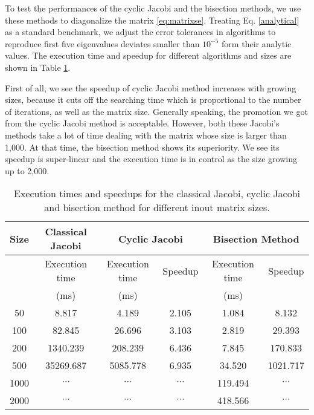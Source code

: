 
To test the performances of the cyclic Jacobi and the bisection methods, we use these methods to diagonalize the matrix \ref{eq:matrixse}. 
Treating Eq. \ref{analytical} as a standard benchmark, we adjust the error tolerances in algorithms to reproduce first five eigenvalues deviates smaller than $10^{-5}$ form their analytic values. 
The execution time and speedup for different algorithms and sizes are shown in Table \ref{bisectiontab}. 

First of all, we see the speedup of cyclic Jacobi method increases with growing sizes, 
because it cuts off the searching time which is proportional to the number of iterations, as well as the matrix size. 
Generally speaking, the promotion we got from the cyclic Jacobi method is acceptable. 
However, both these Jacobi's methods take a lot of time dealing with the matrix whose size is larger than 1,000.
At that time, the bisection method shows its superiority. 
We see its speedup is super-linear and the execution time is in control as the size growing up to 2,000.
\begin{table}[tb]
\centering
\caption{Execution times and speedups for the classical Jacobi, cyclic Jacobi and bisection method for different inout matrix sizes.}
\label{bisectiontab}
\begin{tabular}{cccccc}
\hline
\hline
Size & Classical Jacobi & \multicolumn{2}{c}{Cyclic Jacobi} & \multicolumn{2}{c}{Bisection Method} \\
 \hline
     & Execution time   & Execution time       & Speedup     & Execution time    & Speedup  \\
     &(ms)   & (ms)      &     &(ms)   &  \\
 \hline
50   & 8.817            & 4.189               & 2.105       & 1.084            & 8.132      \\
100  & 82.845           & 26.696              & 3.103       & 2.819            & 29.393     \\
200  & 1340.239         & 208.239             & 6.436       & 7.845            & 170.833    \\
500  & 35269.687        & 5085.778            & 6.935       & 34.520           & 1021.717   \\
1000 &$\cdots$                  &$\cdots$                     &$\cdots$             & 119.494          &$\cdots$            \\
2000 &$\cdots$                  &$\cdots$                     &$\cdots$             & 418.566          & $\cdots$           \\
\hline
\hline
\end{tabular}
\end{table}
